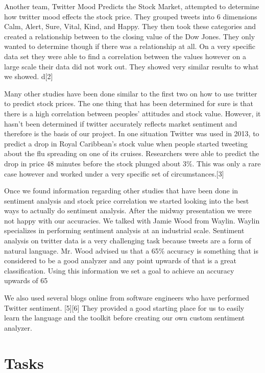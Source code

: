 \documentclass{acm_proc_article-sp}
\begin{document}
Another team, Twitter Mood Predicts the Stock Market, attempted to determine
how twitter mood effects the stock price. They grouped tweets into 6
dimensions Calm, Alert, Sure, Vital, Kind, and Happy. They then took these
categories and created a relationship between to the closing value of the Dow
Jones. They only wanted to determine though if there was a relationship at all. 
On a very specific data set they were able to find a correlation between the values
however on a large scale their data did not work out. They showed very similar
results to what we showed. d[2] 

Many other studies have been done similar to the first two on how to use
twitter to predict stock prices. The one thing that has been determined for
sure is that there is a high correlation between peoples' attitudes and stock
value. However, it hasn't been determined if twitter accurately reflects market sentiment
and therefore is the basis of our project. In one situation Twitter was used in 2013, to predict a drop in Royal Caribbean's stock
value when people started tweeting about the flu spreading on one of its
cruises. Researchers were able to predict the drop in price 48 minutes before
the stock plunged about 3\%. This was only a rare case however and worked under
a very specific set of circumstances.[3]

Once we found information regarding other studies that have been done in
sentiment analysis and stock price correlation we started looking into the best
ways to actually do sentiment analysis. After the midway presentation we were not happy
with our accuracies. We talked with Jamie Wood from Waylin. Waylin specializes
in performing sentiment analysis at an industrial scale. Sentiment analysis on
twitter data is a very challenging task because tweets are a form of natural
language. Mr. Wood advised us that a 65\% accuracy is something that is
considered to be a good analyzer and any point upwards of that is a great
classification. Using this information we set a goal to achieve an accuracy
upwards of 65%

We also used several blogs online from software engineers who have performed
Twitter sentiment. [5][6] They provided a good starting place for us to easily learn
the language and the toolkit before creating our own custom sentiment analyzer. 

\section{Tasks}
\end{document}
